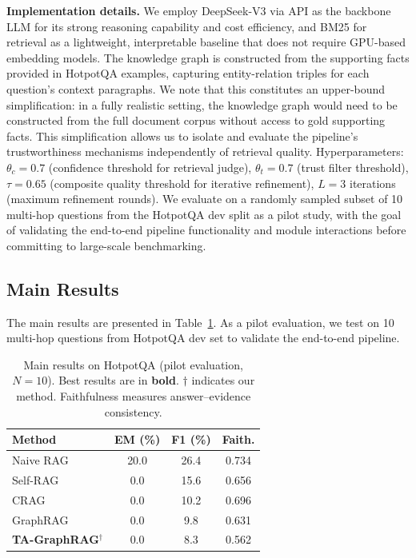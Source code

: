 \documentclass[11pt,a4paper]{article}
\begin{document}
\textbf{Implementation details.} We employ DeepSeek-V3 via API as the backbone LLM for its strong reasoning capability and cost efficiency, and BM25 for retrieval as a lightweight, interpretable baseline that does not require GPU-based embedding models. The knowledge graph is constructed from the supporting facts provided in HotpotQA examples, capturing entity-relation triples for each question's context paragraphs. We note that this constitutes an upper-bound simplification: in a fully realistic setting, the knowledge graph would need to be constructed from the full document corpus without access to gold supporting facts. This simplification allows us to isolate and evaluate the pipeline's trustworthiness mechanisms independently of retrieval quality. Hyperparameters: $\theta_c = 0.7$ (confidence threshold for retrieval judge), $\theta_t = 0.7$ (trust filter threshold), $\tau = 0.65$ (composite quality threshold for iterative refinement), $L = 3$ iterations (maximum refinement rounds). We evaluate on a randomly sampled subset of 10 multi-hop questions from the HotpotQA dev split as a pilot study, with the goal of validating the end-to-end pipeline functionality and module interactions before committing to large-scale benchmarking.

\subsection{Main Results}

The main results are presented in Table~\ref{tab:main_results}. As a pilot evaluation, we test on 10 multi-hop questions from HotpotQA dev set to validate the end-to-end pipeline.

\begin{table}[t]
\centering
\caption{Main results on HotpotQA (pilot evaluation, $N\!=\!10$). Best results are in \textbf{bold}. $\dagger$ indicates our method. Faithfulness measures answer--evidence consistency.}
\label{tab:main_results}
\begin{tabular}{l|cc|c}
\toprule
\textbf{Method} & \textbf{EM (\%)} & \textbf{F1 (\%)} & \textbf{Faith.} \\
\midrule
Naive RAG & 20.0 & 26.4 & 0.734 \\
Self-RAG & 0.0 & 15.6 & 0.656 \\
CRAG & 0.0 & 10.2 & 0.696 \\
GraphRAG & 0.0 & 9.8 & 0.631 \\
\midrule
\textbf{TA-GraphRAG}$^\dagger$ & 0.0 & 8.3 & 0.562 \\
\bottomrule
\end{tabular}
\end{table}
\end{document}
